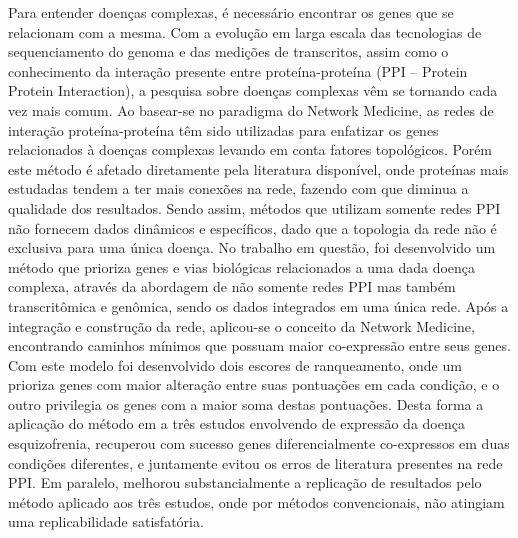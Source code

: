 Para entender doenças complexas, é necessário encontrar os genes que se relacionam com a mesma. Com a evolução em larga escala das tecnologias de sequenciamento do genoma e das medições de transcritos, assim como o conhecimento da interação presente entre proteína-proteína (PPI – Protein Protein Interaction), a pesquisa sobre doenças complexas vêm se tornando cada vez mais comum. Ao basear-se no paradigma do Network Medicine, as redes de interação proteína-proteína têm sido utilizadas para enfatizar os genes relacionados à doenças complexas levando em conta fatores topológicos. Porém este método é afetado diretamente pela literatura disponível, onde proteínas mais estudadas tendem a ter mais conexões na rede, fazendo com que diminua a qualidade dos resultados. Sendo assim, métodos que utilizam somente redes PPI não fornecem dados dinâmicos e específicos, dado que a topologia da rede não é exclusiva para uma única doença. No trabalho em questão, foi desenvolvido um método que prioriza genes e vias biológicas relacionados a uma dada doença complexa, através da abordagem de não somente redes PPI mas também transcritômica e genômica, sendo os dados integrados em uma única rede. Após a integração e construção da rede, aplicou-se o conceito da Network Medicine, encontrando caminhos mínimos que possuam maior co-expressão entre seus genes. Com este modelo foi desenvolvido dois escores de ranqueamento, onde um prioriza genes com maior alteração entre suas pontuações em cada condição, e o outro privilegia os genes com a maior soma destas pontuações. Desta forma a aplicação do método em a três estudos envolvendo de expressão da doença esquizofrenia, recuperou com sucesso genes diferencialmente co-expressos em duas condições diferentes, e juntamente evitou os erros de literatura presentes na rede PPI. Em paralelo, melhorou substancialmente a replicação de resultados pelo método aplicado aos três estudos, onde por métodos convencionais, não atingiam uma replicabilidade satisfatória.

	

	
	


